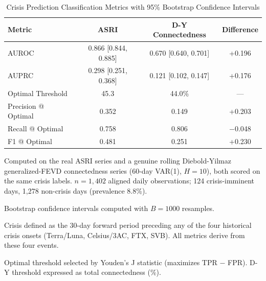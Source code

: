 \begin{table}[H]
\begin{threeparttable}
\centering
\caption{Crisis Prediction Classification Metrics with 95\% Bootstrap Confidence Intervals}
\label{tab:roc_metrics}
\small
\begin{tabular}{lccc}
\toprule
Metric & ASRI & D-Y Connectedness & Difference \\
\midrule
AUROC & 0.866 [0.844, 0.885] & 0.670 [0.640, 0.701] & +0.196 \\
AUPRC & 0.298 [0.251, 0.368] & 0.121 [0.102, 0.147] & +0.176 \\
\midrule
Optimal Threshold & 45.3 & 44.0\% & --- \\
Precision @ Optimal & 0.352 & 0.149 & +0.203 \\
Recall @ Optimal & 0.758 & 0.806 & $-$0.048 \\
F1 @ Optimal & 0.481 & 0.251 & +0.230 \\
\bottomrule
\end{tabular}
\begin{tablenotes}
\small
\item Computed on the real ASRI series and a genuine rolling Diebold-Yilmaz generalized-FEVD connectedness series (60-day VAR(1), $H = 10$), both scored on the same crisis labels. $n = 1{,}402$ aligned daily observations; 124 crisis-imminent days, 1{,}278 non-crisis days (prevalence 8.8\%).
\item Bootstrap confidence intervals computed with $B = 1000$ resamples.
\item Crisis defined as the 30-day forward period preceding any of the four historical crisis onsets (Terra/Luna, Celsius/3AC, FTX, SVB). All metrics derive from these four events.
\item Optimal threshold selected by Youden's J statistic (maximizes TPR $-$ FPR). D-Y threshold expressed as total connectedness (\%).
\end{tablenotes}
\end{threeparttable}
\end{table}